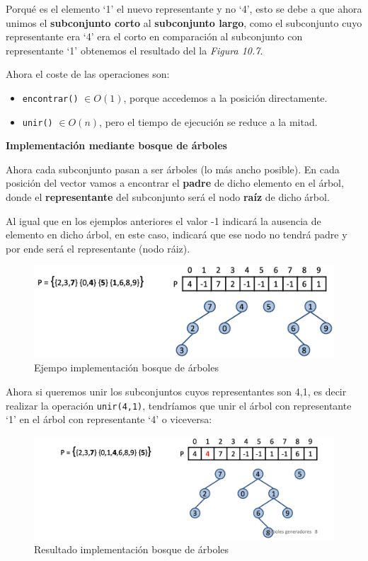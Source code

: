 Porqué es el elemento `1' el nuevo representante y no `4', esto se debe a que ahora unimos el \textbf{subconjunto corto} al \textbf{subconjunto largo}, como el subconjunto cuyo representante era `4' era el corto en comparación al subconjunto con representante `1' obtenemos el resultado del la \textit{Figura 10.7}.

Ahora el coste de las operaciones son:
\begin{itemize}
  \item \texttt{encontrar()} \(\in O(1)\), porque accedemos a la posición directamente.
  \item \texttt{unir()} \(\in O(n)\), pero el tiempo de ejecución se reduce a la mitad.
\end{itemize}
\newpage
\textbf{Implementación mediante bosque de árboles}

Ahora cada subconjunto pasan a ser árboles (lo más ancho posible). En cada posición del vector vamos a encontrar el \textbf{padre} de dicho elemento en el árbol, donde el \textbf{representante} del subconjunto será el nodo \textbf{raíz} de dicho árbol.

Al igual que en los ejemplos anteriores el valor -1 indicará la ausencia de elemento en dicho árbol, en este caso, indicará que ese nodo no tendrá padre y por ende será el representante (nodo ráiz).

\begin{figure}[h]
  \begin{center}
    \includegraphics[width=\textwidth]{assets/impPAR7.png}
  \end{center}
  \caption{Ejempo implementación bosque de árboles}
\end{figure}

Ahora si queremos unir los subconjuntos cuyos representantes son 4,1, es decir realizar la operación \texttt{unir(4,1)}, tendríamos que unir el árbol con representante `1' en el árbol con representante `4' o viceversa:
\begin{figure}[h]
  \begin{center}
    \includegraphics[width=\textwidth]{assets/impPAR9.png}
  \end{center}
  \caption{Resultado implementación bosque de árboles}
\end{figure}

